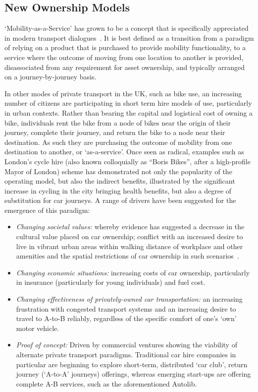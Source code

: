 \documentclass[b5paper,10pt]{article}
\begin{document}
\subsection{New Ownership Models}

`Mobility-as-a-Service' has grown to be a concept that is specifically
appreciated in modern transport dialogues~\citep{tscatapult:2016}. It
is best defined as a transition from a paradigm of relying on a
product that is purchased to provide mobility functionality, to a
service where the outcome of moving from one location to another is
provided, disassociated from any requirement for asset ownership, and
typically arranged on a journey-by-journey basis.

In other modes of private transport in the UK, such as bike use, an
increasing number of citizens are participating in short term hire
models of use, particularly in urban contexts. Rather than bearing the
capital and logistical cost of owning a bike, individuals rent the
bike from a node of bikes near the origin of their journey, complete
their journey, and return the bike to a node near their
destination. As such they are purchasing the outcome of mobility from
one destination to another, or `as-a-service'. Once seen as radical,
examples such as London's cycle hire (also known colloquially as
``Boris Bikes'', after a high-profile Mayor of London) scheme has
demonstrated not only the popularity of the operating model, but also
the indirect benefits, illustrated by the significant increase in
cycling in the city bringing health benefits, but also a degree of
substitution for car journeys. A range of drivers have been suggested
for the emergence of this paradigm:

\begin{itemize}
\item {\emph{Changing societal values:}} whereby evidence has
suggested a decrease in the cultural value placed on car ownership;
conflict with an increased desire to live in vibrant urban areas
within walking distance of workplace and other amenities and the
spatial restrictions of car ownership in such
scenarios~\citep{jenks+burgess:2011}.
\item {\emph{Changing economic situations:}} increasing costs of car
ownership, particularly in insurance (particularly for young
individuals) and fuel cost.
\item {\emph{Changing effectiveness of privately-owned car
transportation:}} an increasing frustration with congested transport
systems and an increasing desire to travel to A-to-B reliably,
regardless of the specific comfort of one's `own' motor vehicle.
\item {\emph{Proof of concept:}} Driven by commercial ventures showing
the viability of alternate private transport paradigms. Traditional
car hire companies in particular are beginning to explore short-term,
distributed `car club', return journey (`A-to-A' journeys) offerings,
whereas emerging start-ups are offering complete A-B services, such as
the aforementioned Autolib.
\end{itemize}
\end{document}
